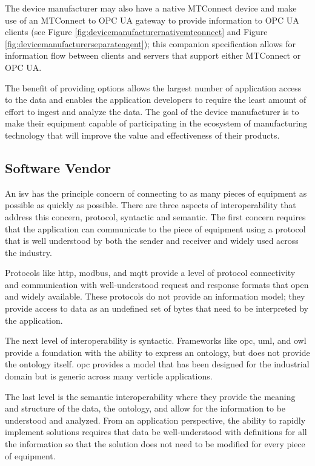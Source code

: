 

The device manufacturer may also have a native MTConnect device and make use of an MTConnect to OPC UA gateway to provide information to OPC UA clients (see Figure \ref{fig:devicemanufacturernativemtconnect} and Figure \ref{fig:devicemanufacturerseparateagent}); this companion specification allows for information flow between clients and servers that support either MTConnect or OPC UA.

The benefit of providing options allows the largest number of application access to the data and enables the application developers to require the least amount of effort to ingest and analyze the data. The goal of the device manufacturer is to make their equipment capable of participating in the ecosystem of manufacturing technology that will improve the value and effectiveness of their products. 



\FloatBarrier

\subsection{Software Vendor}

An \gls{isv} has the principle concern of connecting to as many pieces of equipment as possible as quickly as possible. There are three aspects of interoperability that address this concern, protocol, syntactic and semantic. The first concern requires that the application can communicate to the piece of equipment using a protocol that is well understood by both the sender and receiver and widely used across the industry. 

Protocols like \gls{http}, \gls{modbus}, and  \gls{mqtt} provide a level of protocol connectivity and communication with well-understood request and response formats that open and widely available. These protocols do not provide an information model; they provide access to data as an undefined set of bytes that need to be interpreted by the application.

The next level of interoperability is syntactic. Frameworks like \gls{opc}, \gls{uml}, and \gls{owl} provide a foundation with the ability to express an \gls{ontology}, but does not provide the \gls{ontology} itself. \gls{opc} provides a model that has been designed for the industrial domain but is generic across many verticle applications. 

The last level is the semantic interoperability where they provide the meaning and structure of the data, the \gls{ontology}, and allow for the information to be understood and analyzed. From an application perspective, the ability to rapidly implement solutions requires that data be well-understood with definitions for all the information so that the solution does not need to be modified for every piece of equipment. 


